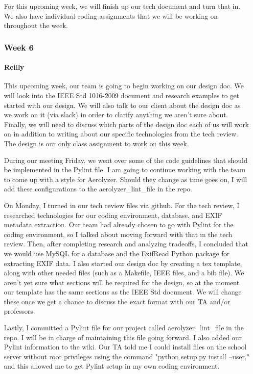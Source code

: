 \documentclass[onecolumn, draftclsnofoot,10pt, compsoc]{IEEEtran}
\begin{document}
\begin{flushleft}
 
For this upcoming week, we will finish up our tech document and turn that in. We also have individual coding assignments that we will be working on throughout the week.
 
\subsubsection{Week 6}
\paragraph{Reilly}
 
This upcoming week, our team is going to begin working on our design doc. We will look into the IEEE Std 1016-2009 document and research examples to get started with our design. We will also talk to our client about the design doc as we work on it (via slack) in order to clarify anything we aren't sure about. Finally, we will need to discuss which parts of the design doc each of us will work on in addition to writing about our specific technologies from the tech review. The design is our only class assignment to work on this week.
 
During our meeting Friday, we went over some of the code guidelines that should be implemented in the Pylint file. I am going to continue working with the team to come up with a style for Aerolyzer. Should they change as time goes on, I will add these configurations to the aerolyzer\_lint\_file in the repo.
 
 
On Monday, I turned in our tech review files via github. For the tech review, I researched technologies for our coding environment, database, and EXIF metadata extraction. Our team had already chosen to go with Pylint for the coding environment, so I talked about moving forward with that in the tech review. Then, after completing research and analyzing tradeoffs, I concluded that we would use MySQL for a database and the ExifRead Python package for extracting EXIF data. I also started our design doc by creating a tex template, along with other needed files (such as a Makefile, IEEE files, and a bib file). We aren't yet sure what sections will be required for the design, so at the moment our template has the same sections as the IEEE Std document. We will change these once we get a chance to discuss the exact format with our TA and/or professors.
 
Lastly, I committed a Pylint file for our project called aerolyzer\_lint\_file in the repo. I will be in charge of maintaining this file going forward. I also added our Pylint information to the wiki. Our TA told me I could install files on the school server without root privileges using the command "python setup.py install --user," and this allowed me to get Pylint setup in my own coding environment.
 

\end{flushleft}
\end{document}
